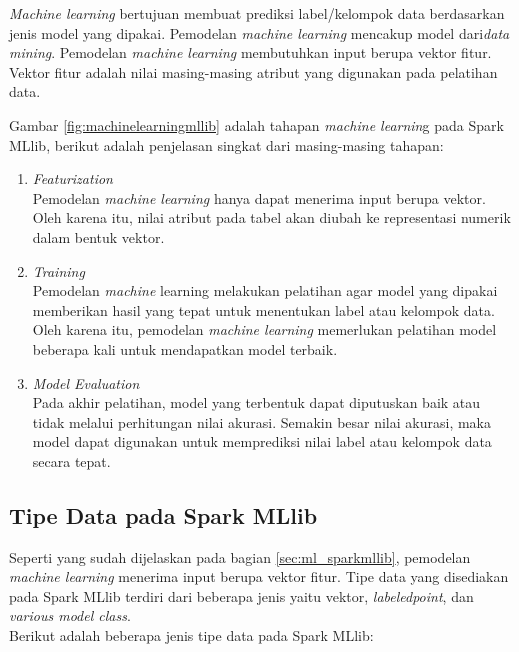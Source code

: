\textit{Machine learning} bertujuan membuat prediksi label/kelompok data berdasarkan jenis model yang dipakai. Pemodelan \textit{machine learning} mencakup model dari\textit{data mining}. Pemodelan \textit{machine learning} membutuhkan input berupa vektor fitur. Vektor fitur adalah nilai masing-masing atribut yang digunakan pada pelatihan data. 

\noindent Gambar \ref{fig:machinelearningmllib} adalah tahapan \textit{machine learnin}g pada Spark MLlib, berikut adalah penjelasan singkat dari masing-masing tahapan:

\begin{enumerate}

\item \textit{Featurization}\\
Pemodelan \textit{machine learning} hanya dapat menerima input berupa vektor. Oleh karena itu, nilai atribut pada tabel akan diubah ke representasi numerik dalam bentuk vektor. 
 
\item \textit{Training}\\
Pemodelan \textit{machine} learning melakukan pelatihan agar model yang dipakai memberikan hasil yang tepat untuk menentukan label atau kelompok data. Oleh karena itu, pemodelan \textit{machine learning} memerlukan pelatihan model beberapa kali untuk mendapatkan model terbaik.

\item \textit{Model Evaluation}\\
Pada akhir pelatihan, model yang terbentuk dapat diputuskan baik atau tidak melalui perhitungan nilai akurasi. Semakin besar nilai akurasi, maka model dapat digunakan untuk memprediksi nilai label atau kelompok data secara tepat.
\end{enumerate}

\subsection{Tipe Data pada Spark MLlib}
Seperti yang sudah dijelaskan pada bagian \ref{sec:ml_sparkmllib}, pemodelan \textit{machine learning} menerima input berupa vektor fitur. Tipe data yang disediakan pada Spark MLlib terdiri dari beberapa jenis yaitu vektor, \textit{labeledpoint}, dan \textit{various model class}. \\

\noindent Berikut adalah beberapa jenis tipe data pada Spark MLlib:

